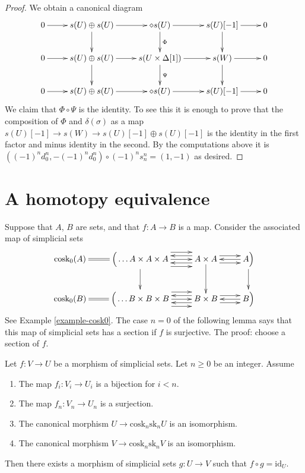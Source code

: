 \begin{proof}
\medskip\noindent
We obtain a canonical diagram
$$
\xymatrix{
0 \ar[r] &
s(U) \oplus s(U) \ar[r] \ar[d] &
\diamond{s(U)} \ar[r] \ar[d]^{\Phi}&
s(U)[-1] \ar[r] \ar[d] &
0 \\
0 \ar[r] &
s(U) \oplus s(U) \ar[r] \ar[d] &
s(U \times \Delta[1]) \ar[r] \ar[d]^\Psi &
s(W) \ar[r] \ar[d] &
0 \\
0 \ar[r] &
s(U) \oplus s(U) \ar[r] &
\diamond{s(U)} \ar[r] &
s(U)[-1] \ar[r] &
0
}
$$
We claim that $\Phi \circ \Psi$ is the identity.
To see this it is enough to prove that the composition
of $\Phi$ and $\delta(\sigma)$ as a map
$s(U)[-1] \to s(W) \to s(U)[-1] \oplus s(U)[-1]$ is the
identity in the first factor and minus identity in the second.
By the computations above it is
$((-1)^nd^n_0, -(-1)^nd^n_0) \circ (-1)^n s^n_n = (1, -1)$
as desired.
\end{proof}


\section{A homotopy equivalence}
\label{section-homotopy-equivalence}

\noindent
Suppose that $A$, $B$ are sets, and that $f : A \to B$
is a map. Consider the associated map of
simplicial sets
$$
\xymatrix{
\text{cosk}_0(A) \ar@{=}[r] &
\Big(
\ldots
A\times A \times A
\ar[d]
\ar@<2ex>[r]
\ar@<0ex>[r]
\ar@<-2ex>[r]
&
A \times A
\ar[d]
\ar@<1ex>[r]
\ar@<-1ex>[r]
\ar@<1ex>[l]
\ar@<-1ex>[l]
&
A
\ar[d]
\ar@<0ex>[l]
\Big)
\\
\text{cosk}_0(B) \ar@{=}[r] &
\Big(
\ldots
B\times B \times B
\ar@<2ex>[r]
\ar@<0ex>[r]
\ar@<-2ex>[r]
&
B \times B
\ar@<1ex>[r]
\ar@<-1ex>[r]
\ar@<1ex>[l]
\ar@<-1ex>[l]
&
B
\ar@<0ex>[l]
\Big)
}
$$
See Example \ref{example-cosk0}.
The case $n = 0$ of the following lemma
says that this map of simplicial sets
has a section if $f$ is surjective.
The proof: choose a section of $f$.

\begin{lemma}
\label{lemma-section}
Let $f : V \to U$ be a morphism of simplicial sets.
Let $n \geq 0$ be an integer.
Assume
\begin{enumerate}
\item The map $f_i : V_i \to U_i$ is a bijection for $i < n$.
\item The map $f_n : V_n \to U_n$ is a surjection.
\item The canonical morphism $U \to \text{cosk}_n \text{sk}_n U$
is an isomorphism.
\item The canonical morphism $V \to \text{cosk}_n \text{sk}_n V$
is an isomorphism.
\end{enumerate}
Then there exists a morphism of simplicial sets $g : U \to V$
such that $f \circ g = \text{id}_U$.
\end{lemma}

